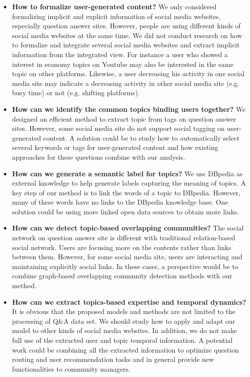 \begin{itemize}
\item{\textbf{How to formalize user-generated content?}
We only considered formalizing implicit and explicit information of social media websites, especially question answer sites. However, people are using different kinds of social media websites at the same time. We did not conduct research on how to formalize and integrate several social media websites and extract implicit information from the integrated view. For instance a user who showed a interest in economy topics on Youtube may also be interested in the same topic on other platforms. Likewise, a user decreasing his activity in one social media site may indicate a decreasing activity in other social media site (e.g. busy time) or not (e.g. shifting platforms).}

\item{\textbf{How can we identify the common topics binding users together?} We designed an efficient method to extract topic from tags on question answer sites. However, some social media site do not support social tagging on user-generated content. A solution could be to study how to automatically select several keywords or tags for user-generated content and how existing approaches for these questions combine with our analysis.}

\item{\textbf{How can we generate a semantic label for topics?} We use DBpedia as external knowledge to help generate labels capturing the meaning of topics. A key step of our method is to link the words of a topic to DBpedia. However, many of these words have no links to the DBpedia knowledge base. One solution could be using more linked open data sources to obtain more links.}

\item{\textbf{How can we detect topic-based overlapping communities?} The social network on question answer site is different with traditional relation-based social network. Users are focusing more on the contents rather than links between them. However, for some social media site, users are interacting and maintaining explicitly social links. In these cases, a perspective would be to combine graph-based overlapping community detection methods with our method.}

\item{\textbf{How can we extract topics-based expertise and temporal dynamics?} It is obvious that the proposed models and methods are not limited to the processing of Q\&A data set. We should study how to apply and adapt our model to other kinds of social media websites. In addition, we do not make full use of the extracted user and topic temporal information. A potential work could be combining all the extracted information to optimize question routing and user recommendation tasks and in general provide new functionalities to community managers.}

\end{itemize}




